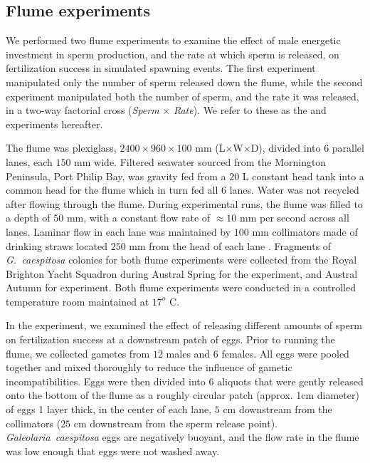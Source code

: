 \documentclass{article}
\begin{document}
	\subsection*{Flume experiments}
	We performed two flume experiments to examine the effect of male energetic investment in sperm production, and the rate at which sperm is released, on fertilization success in simulated spawning events. The first experiment manipulated only the number of sperm released down the flume, while the second experiment manipulated both the number of sperm, and the rate it was released, in a two-way factorial cross (\textit{Sperm} $\times$ \textit{Rate}). We refer to these as the  and  experiments hereafter. 

	The flume was plexiglass, $2400 \times 960 \times 100$ mm (L$\times$W$\times$D), divided into $6$ parallel lanes, each $150$ mm wide. Filtered seawater sourced from the Mornington Peninsula, Port Philip Bay, was gravity fed from a $20$ L constant head tank into a common head for the flume which in turn fed all $6$ lanes. Water was not recycled after flowing through the flume. During experimental runs, the flume was filled to a depth of $50$ mm, with a constant flow rate of $\approx 10$ mm per second across all lanes. Laminar flow in each lane was maintained by $100$ mm collimators made of drinking straws located $250$ mm from the head of each lane \citep{YundMeidel2003}. Fragments of \textit{G.~caespitosa} colonies for both flume experiments were collected from the Royal Brighton Yacht Squadron during Austral Spring for the  experiment, and Austral Autumn for  experiment. Both flume experiments were conducted in a controlled temperature room maintained at $17^o$ C.

	In the  experiment, we examined the effect of releasing different amounts of sperm on fertilization success at a downstream patch of eggs. Prior to running the flume, we collected gametes from $12$ males and $6$ females. All eggs were pooled together and mixed thoroughly to reduce the influence of gametic incompatibilities. Eggs were then divided into $6$ aliquots that were gently released onto the bottom of the flume as a roughly circular patch (approx. 1cm diameter) of eggs 1 layer thick, in the center of each lane, $5$ cm downstream from the collimators ($25$ cm downstream from the sperm release point). \textit{Galeolaria~caespitosa} eggs are negatively buoyant, and the flow rate in the flume was low enough that eggs were not washed away. 
\end{document}
